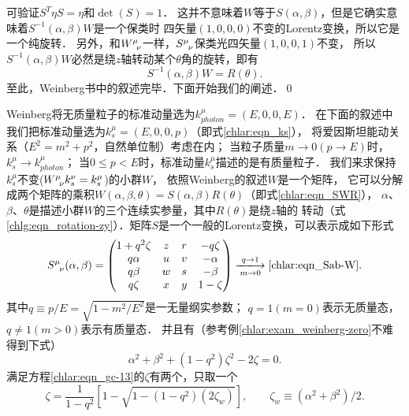 可验证$S^T \eta S = \eta $和$\det(S)=1$．
这并不意味着$W$等于$S(\alpha, \beta)$，但是它确实意味着$S^{-1}(\alpha, \beta)W$是一个保类时
四矢量$(1,0,0,0)$不变的Lorentz变换，所以它是一个纯旋转．
另外，和$W^\mu_{\hphantom{\mu}\nu}$一样，$S^\mu_{\hphantom{\mu}\nu}$保类光四矢量$(1,0,0,1)$不变，
所以$S^{-1}(\alpha, \beta)W$必然是绕$z$轴转动某个$\theta$角的旋转，即有
\begin{equation}\label{chlar:eqn_SWR}
	S^{-1}(\alpha, \beta) W=R(\theta).
\end{equation}
至此，Weinberg书中的叙述完毕．下面开始我们的阐述．\qed




Weinberg将无质量粒子的标准动量选为$k_{photon}^\mu=(E,0,0,E)$．
在下面的叙述中我们把标准动量选为${k^\mu_s } = ({E,0,0,p} )$（即式\eqref{chlar:eqn_ks}），
将爱因斯坦能动关系（$E^2=m^2+p^2$，自然单位制）考虑在内；
当粒子质量$m\to 0(p\to E)$时，$k^\mu_s \to k_{photon}^\mu$；
当$0 \leqslant p <E$时，标准动量$k^\mu_s$描述的是有质量粒子．
我们来求保持$k^\mu_s$不变($W_{\hphantom{\mu}\nu} ^\mu {k^\nu_s } = {k^\mu_s }$)的小群$W$，
依照Weinberg的叙述$W$是一个矩阵，
它可以分解成两个矩阵的乘积$W(\alpha,\beta,\theta) = S(\alpha,\beta)R(\theta)$（即式\eqref{chlar:eqn_SWR}），
$\alpha$、$\beta$、$\theta$是描述小群$W$的三个连续实参量，其中$R(\theta)$是绕$z$轴的
转动（式\eqref{chlg:eqn_rotation-zy}）．矩阵$S$是一个一般的Lorentz变换，可以表示成如下形式
	\begin{equation}\label{chlar:eqn_Sab}
		S^\mu_{\hphantom{\mu}\nu}(\alpha,\beta) = \begin{pmatrix}
			{1 + {q^2}\zeta } &z&r&{ - q\zeta } \\
			{q\alpha }&u&v&{ - \alpha } \\
			{q\beta }& w&s&{ - \beta } \\
			{q\zeta }& x&y&{1 - \zeta }
		\end{pmatrix} 
		\xlongrightarrow[m\to 0]{q\to 1} \eqref{chlar:eqn_Sab-W}.
	\end{equation}
其中$q\equiv p/E=\sqrt{1-m^2/E^2}$是一无量纲实参数；
$q=1(m=0)$表示无质量态，$q\neq 1 (m>0)$表示有质量态．
并且有（参考例\ref{chlar:exam_weinberg-zero}不难得到下式）
\begin{equation}\label{chlar:eqn_gc-13}
	{\alpha ^2} + {\beta ^2} + \left( {1 - {q^2}} \right){\zeta ^2} - 2\zeta  = 0 .
\end{equation}
满足方程\eqref{chlar:eqn_gc-13}的$\zeta$有两个，只取一个
\begin{equation}\label{chlar:eqn_gc-15}
	\zeta  = \frac{1}{{1 - {q^2}}}\left[ {1-\sqrt{1-({1-{q^2}})(2\zeta_w)} } \right],
	\qquad \zeta_w \equiv (\alpha ^2 + \beta ^2)/2 .
\end{equation}
